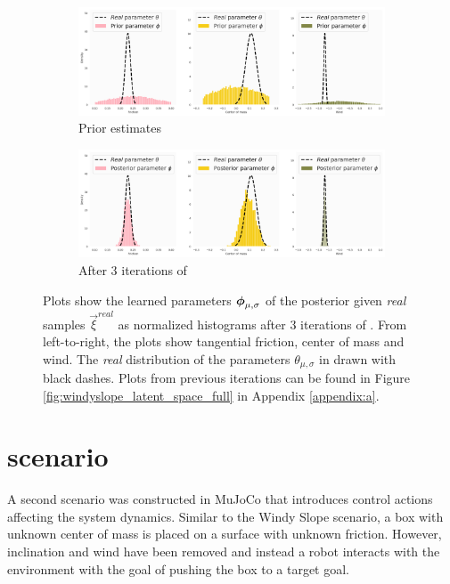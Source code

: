 \begin{figure}[h!]
\centering
\captionsetup{size=footnotesize}
\begin{subfigure}{\linewidth}
  \includegraphics[width=1.0\linewidth]{img/windyslope/latent-representation/iter0_style_phi}
  \caption{Prior estimates}
\end{subfigure}
\begin{subfigure}{\textwidth}
  \includegraphics[width=1.0\linewidth]{img/windyslope/latent-representation/iter4_10_style}
  \caption{After 3 iterations of \dettostoc{}}
\end{subfigure}
\caption{Plots show the learned parameters $\boldsymbol{\phi}_{\mu, \sigma}$ of the posterior given \emph{real} samples $\vec{\xi}^{real}$ as normalized histograms after 3 iterations of \dettostoc{}.
From left-to-right, the plots show tangential friction, center of mass and wind. The \emph{real} distribution of the parameters $\theta_{\mu, \sigma}$ in drawn with black dashes. Plots from previous iterations can be found in Figure \ref{fig:windyslope_latent_space_full} in Appendix \ref{appendix:a}.}
\label{fig:windyslope_latent_space}
\end{figure}

\clearpage
\section{\yp{} scenario}

A second scenario was constructed in MuJoCo that introduces control actions affecting the system dynamics. Similar to the Windy Slope scenario, a box with unknown center of mass is placed on a surface with unknown friction. However, inclination and wind have been removed and instead a robot interacts with the environment with the goal of pushing the box to a target goal.


